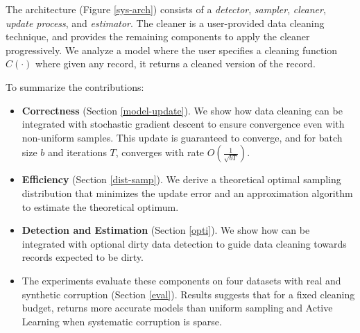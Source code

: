 
The \sys architecture (Figure \ref{sys-arch}) consists of a \emph{detector}, \emph{sampler}, \emph{cleaner}, \emph{update process}, and \emph{estimator}.
The cleaner is a user-provided data cleaning technique, and \sys provides the remaining components to apply the cleaner progressively.
We analyze a model where the user specifies a cleaning function $C(\cdot)$ where given any record, it returns a cleaned version of the record.

\noindent To summarize the contributions:
\begin{itemize}[noitemsep]
\item \textbf{Correctness} (Section \ref{model-update}). We show how data cleaning can be integrated with stochastic gradient descent to ensure convergence even with non-uniform samples. This update is guaranteed to converge, and for batch size $b$ and iterations $T$, converges with rate $O(\frac{1}{\sqrt{bT}})$. 
\item \textbf{Efficiency} (Section \ref{dist-samp}). We derive a theoretical optimal sampling distribution that minimizes the update error and an approximation algorithm to estimate the theoretical optimum.
\item \textbf{Detection and Estimation} (Section \ref{opti}). We show how \sys can be integrated with optional dirty data detection to guide data cleaning towards records expected to be dirty.
\item The experiments evaluate these components on four datasets with real and synthetic corruption (Section \ref{eval}). Results suggests that for a fixed cleaning budget, \sys returns more accurate models than uniform sampling and Active Learning when systematic corruption is sparse.

\end{itemize}






